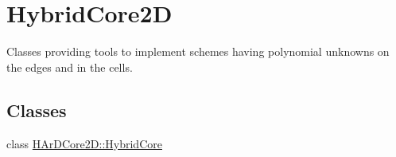 \hypertarget{group__HybridCore2D}{}\section{Hybrid\+Core2D}
\label{group__HybridCore2D}


Classes providing tools to implement schemes having polynomial unknowns on the edges and in the cells.  


\subsection*{Classes}
\begin{DoxyCompactItemize}
\item 
class \hyperlink{classHArDCore2D_1_1HybridCore}{H\+Ar\+D\+Core2\+D\+::\+Hybrid\+Core}
\end{DoxyCompactItemize}
